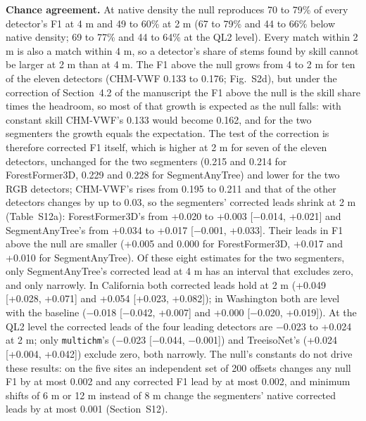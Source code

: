 \documentclass[10pt,a4paper]{article}
\begin{document}
\textbf{Chance agreement.} At native density the null reproduces 70 to 79\% of every
detector's F1 at 4 m and 49 to 60\% at 2 m (67 to 79\% and 44 to 66\% below native
density; 69 to 77\% and 44 to 64\% at the QL2 level). Every match within 2 m is
also a match within 4 m, so a detector's share of stems found by skill cannot be
larger at 2 m than at 4 m. The F1 above the null grows from 4 to 2 m for ten of
the eleven detectors (CHM-VWF 0.133 to 0.176; Fig.~S2d), but under the
correction of Section~4.2 of the manuscript the F1 above the null is the skill
share times the headroom, so most of that growth is expected as the null falls:
with constant skill CHM-VWF's 0.133 would become 0.162, and for the two
segmenters the growth equals the expectation. The test of the correction is
therefore corrected F1 itself, which is higher at 2 m for seven of the eleven
detectors, unchanged for the two segmenters (0.215 and 0.214 for ForestFormer3D,
0.229 and 0.228 for SegmentAnyTree) and lower for the two RGB detectors;
CHM-VWF's rises from 0.195 to 0.211 and that of the other detectors changes by
up to 0.03, so the segmenters' corrected leads shrink at 2 m (Table~S12a):
ForestFormer3D's from +0.020 to +0.003 [$-$0.014, +0.021] and SegmentAnyTree's
from +0.034 to +0.017 [$-$0.001, +0.033]. Their leads in F1 above the null are
smaller (+0.005 and 0.000 for ForestFormer3D, +0.017 and +0.010 for
SegmentAnyTree). Of these eight estimates for the two segmenters, only
SegmentAnyTree's corrected lead at 4 m has an interval that excludes zero, and
only narrowly. In California both corrected leads hold at 2 m (+0.049 [+0.028,
+0.071] and +0.054 [+0.023, +0.082]); in Washington both are level with the
baseline ($-$0.018 [$-$0.042, +0.007] and +0.000 [$-$0.020, +0.019]). At the QL2 level
the corrected leads of the four leading detectors are $-$0.023 to +0.024 at 2 m;
only \texttt{multichm}'s ($-$0.023 [$-$0.044, $-$0.001]) and TreeisoNet's (+0.024 [+0.004,
+0.042]) exclude zero, both narrowly. The null's constants do not drive these
results: on the five sites an independent set of 200 offsets changes any null F1
by at most 0.002 and any corrected F1 lead by at most 0.002, and minimum shifts
of 6 m or 12 m instead of 8 m change the segmenters' native corrected leads by
at most 0.001 (Section~S12).
\end{document}
